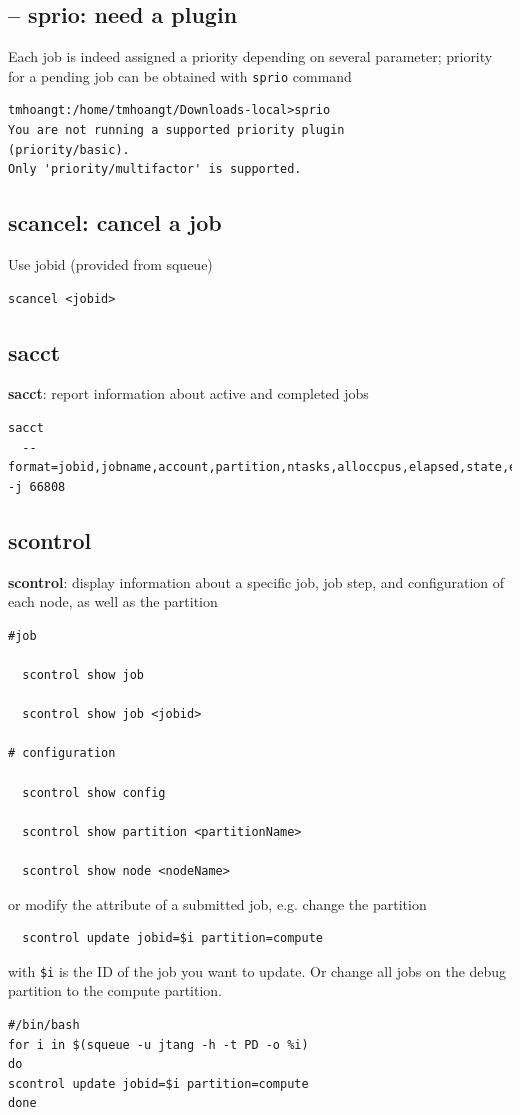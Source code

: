 \subsection{-- sprio: need a plugin}

Each job is indeed assigned a priority depending on several parameter; priority
for a pending job can be obtained with \verb!sprio! command

\begin{verbatim}
tmhoangt:/home/tmhoangt/Downloads-local>sprio
You are not running a supported priority plugin
(priority/basic).
Only 'priority/multifactor' is supported.
\end{verbatim}



\subsection{scancel: cancel a job}
\label{sec:scancel}

Use jobid (provided from squeue)
\begin{verbatim}
scancel <jobid>
\end{verbatim}

\subsection{sacct}
\label{sec:sacct}

{\bf sacct}: report information about active and completed jobs
  
{\tiny
  \begin{verbatim}
sacct
  --format=jobid,jobname,account,partition,ntasks,alloccpus,elapsed,state,exitcode -j 66808
  \end{verbatim}
}

\subsection{scontrol}
\label{sec:scontrol}

{\bf scontrol}: display information about a specific job, job step, and
configuration of each node, as well as the partition
  \begin{verbatim}
#job
  
  scontrol show job
  
  scontrol show job <jobid>
  
# configuration 

  scontrol show config
    
  scontrol show partition <partitionName>
  
  scontrol show node <nodeName>
  \end{verbatim}
  or modify the attribute of a submitted job, e.g. change the partition
  \begin{verbatim}
  scontrol update jobid=$i partition=compute
  \end{verbatim}
  with \verb!$i! is the ID of the job you want to update.
 Or change all jobs on the debug partition to the compute partition.
 \begin{verbatim}
#/bin/bash
for i in $(squeue -u jtang -h -t PD -o %i)
do
scontrol update jobid=$i partition=compute
done
 \end{verbatim}

